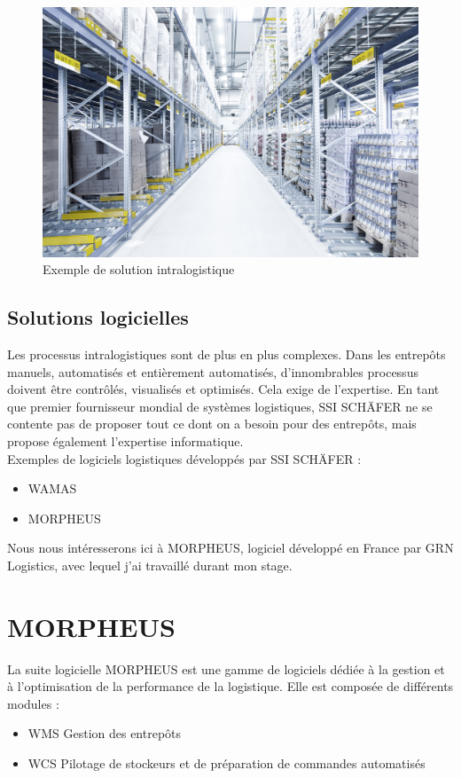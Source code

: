 \documentclass[a4paper, 12pt, french]{article}
\newcommand{\bdot}{\item[\color{ssiYellow}\ding{108}]}
\begin{document}
			\begin{figure}[h!]
				\begin{center}
					\includegraphics[width=0.7\linewidth]{images/intralogistic.jpg}
				\end{center}
				\caption{Exemple de solution intralogistique}
				\label{fig:intralogistic}
			\end{figure}
			\newpage
			\subsection{Solutions logicielles}
				Les processus intralogistiques sont de plus en plus complexes. Dans les entrepôts manuels, automatisés et entièrement automatisés, d'innombrables processus doivent être contrôlés, visualisés et optimisés. Cela exige de l'expertise. En tant que premier fournisseur mondial de systèmes logistiques, SSI SCHÄFER ne se contente pas de proposer tout ce dont on a besoin pour des entrepôts, mais propose également l'expertise informatique.\\

				\noindent
				Exemples de logiciels logistiques développés par SSI SCHÄFER :
				\begin{itemize}
					\bdot{WAMAS}
					\bdot{MORPHEUS}
				\end{itemize}
				\vspace{\baselineskip}
				\par Nous nous intéresserons ici à MORPHEUS, logiciel développé en France par GRN Logistics, avec lequel j'ai travaillé durant mon stage.
		
		\section{MORPHEUS}
				La suite logicielle MORPHEUS est une gamme de logiciels dédiée à la gestion et à l'optimisation de la performance de la logistique. Elle est composée de différents modules :
			\begin{itemize}
				\bdot{\gls{WMS} Gestion des entrepôts}
				\bdot{\gls{WCS} Pilotage de stockeurs et de préparation de commandes automatisés}
			\end{itemize}
\end{document}
